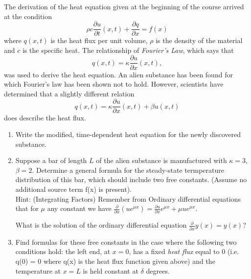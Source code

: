 
The derivation of the heat equation given at the beginning of the course arrived at the condition 
\[
\rho c \frac{\partial u}{\partial t} (x,t) + \frac{\partial q}{\partial x} = f(x)
\]
where $q(x,t)$ is the heat flux per unit volume, $\rho$ is the density of the material and $c$ is the specific heat.  The relationship of \textit{Fourier's Law}, which says that 
\[
q(x,t) = \kappa \frac{\partial u}{\partial x}(x,t),
\]
was used to derive the heat equation.  An alien substance has been found for which Fourier's law has been shown not to hold.  However, scientists have determined that a slightly different relation
\[
q(x,t) = \kappa\frac{\partial u}{\partial x}(x,t) + \beta u(x,t)
\]
does describe the heat flux.

\begin{enumerate}
\item Write the modified, time-dependent heat equation for the newly discovered substance.  

\item Suppose a bar of length $L$ of the alien substance is manufactured with $\kappa = 3$, $\beta = 2$.  Determine a general formula for the steady-state termperature distribution of this bar, which should include two free constants.  (Assume no additional source term f(x) is present). \\ \vspace{0.1em} Hint: (Integrating Factors) Remember from Ordinary differential equations that for $\mu$ any constant we have $\frac{\partial}{\partial x} \left( u e^{\mu x}\right) = \frac{\partial u}{\partial x} e^{\mu x} + \mu u e^{\mu x} $.

What is the solution of the ordinary differential equation $\frac{\partial}{\partial x}y(x) = y(x)$? 

\item Find formulas for these free constants in the case where the following two conditions hold: the left end, at $x=0$, has a fixed \textit{heat flux} equal to $0$ (i.e. q(0) = 0 where q(x) is the heat flux function given above) and the temperature at $x=L$ is held constant at $\delta$ degrees.



\end{enumerate}